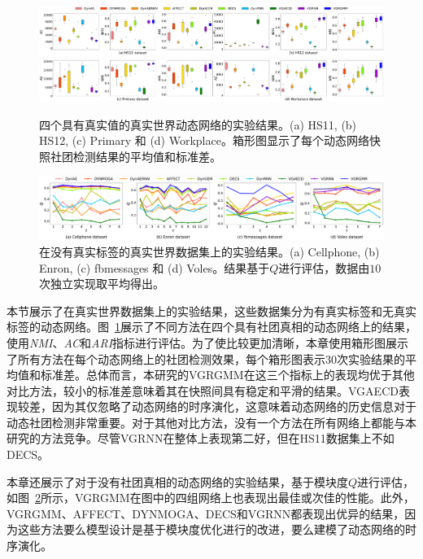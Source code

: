 \begin{figure}[htbp]
    \centering

    \includegraphics[width=1\textwidth]{figures/chap06/realDataGHS-box.pdf}
    \includegraphics[width=1\textwidth]{figures/chap06/realDataGpw-box.pdf}
    \caption{四个具有真实值的真实世界动态网络的实验结果。(a) HS11, (b) HS12, (c) Primary 和 (d) Workplace。箱形图显示了每个动态网络快照社团检测结果的平均值和标准差。}
    \label{fig:realnet}
    \vspace{0cm}
\end{figure}

\begin{figure}[htbp]
    \centering
    \includegraphics[width=1\textwidth]{figures/chap06/realDataNG.pdf}
    \caption{在没有真实标签的真实世界数据集上的实验结果。(a) Cellphone, (b) Enron, (c) fbmessages 和 (d) Voles。结果基于$Q$进行评估，数据由$10$次独立实现取平均得出。}
    \label{fig:noTruth}
    \vspace{0cm}
\end{figure}

本节展示了在真实世界数据集上的实验结果，这些数据集分为有真实标签和无真实标签的动态网络。图~\ref{fig:realnet}展示了不同方法在四个具有社团真相的动态网络上的结果，使用\emph{NMI}、\emph{AC}和\emph{ARI}指标进行评估。为了使比较更加清晰，本章使用箱形图展示了所有方法在每个动态网络上的社团检测效果，每个箱形图表示$30$次实验结果的平均值和标准差。总体而言，本研究的VGRGMM在这三个指标上的表现均优于其他对比方法，较小的标准差意味着其在快照间具有稳定和平滑的结果。VGAECD表现较差，因为其仅忽略了动态网络的时序演化，这意味着动态网络的历史信息对于动态社团检测非常重要。对于其他对比方法，没有一个方法在所有网络上都能与本研究的方法竞争。尽管VGRNN在整体上表现第二好，但在HS11数据集上不如DECS。

本章还展示了对于没有社团真相的动态网络的实验结果，基于模块度$Q$进行评估，如图~\ref{fig:noTruth}所示，VGRGMM在图中的四组网络上也表现出最佳或次佳的性能。此外，VGRGMM、AFFECT、DYNMOGA、DECS和VGRNN都表现出优异的结果，因为这些方法要么模型设计是基于模块度优化进行的改进，要么建模了动态网络的时序演化。

